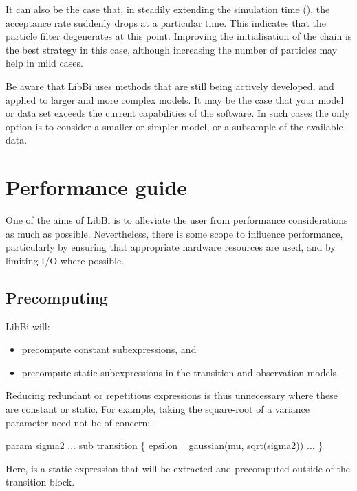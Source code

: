 \begin{tip}
It can also be the case that, in steadily extending the simulation time
(), the acceptance rate suddenly drops at a particular
time. This indicates that the particle filter degenerates at this
point. Improving the initialisation of the chain is the best strategy in this
case, although increasing the number of particles may help in mild cases.
\end{tip}

Be aware that LibBi uses methods that are still being actively developed, and
applied to larger and more complex models. It may be the case that your model
or data set exceeds the current capabilities of the software. In such cases
the only option is to consider a smaller or simpler model, or a subsample of
the available data.

\section{Performance guide\label{Performance guide}}

One of the aims of LibBi is to alleviate the user from performance
considerations as much as possible. Nevertheless, there is some scope to
influence performance, particularly by ensuring that appropriate hardware
resources are used, and by limiting I/O where possible.

\subsection{Precomputing}

LibBi will:
\begin{itemize}
\item precompute constant subexpressions, and
\item precompute static subexpressions in the transition and observation
  models.
\end{itemize}
Reducing redundant or repetitious expressions is thus unnecessary where these
are constant or
static. For example, taking the square-root of a
variance parameter need not be of concern:
\begin{bicode}
param sigma2
\(\ldots\)
sub transition \{
  epsilon ~ gaussian(mu, sqrt(sigma2))
  \(\ldots\)
\}
\end{bicode}
Here,  is a static expression
that will be extracted and precomputed outside of the transition block.

